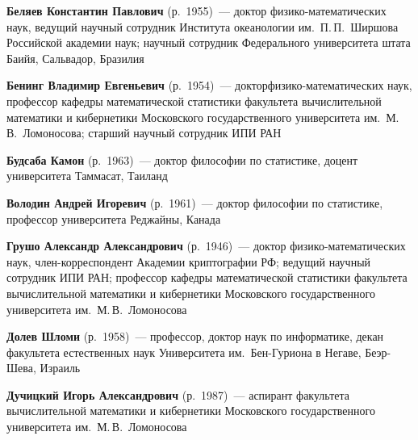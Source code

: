 \begin{multicols}{2}




\noindent
\textbf{Беляев Константин Павлович} (р.\ 1955)~--- доктор фи\-зи\-ко-ма\-те\-ма\-ти\-че\-ских 
наук, ведущий научный сотрудник Института океанологии им.\ П.\,П.~Ширшова 
Российской академии наук; научный сотрудник Федерального университета штата Баийя, 
Сальвадор, Бразилия

\vspace*{4pt}

\noindent
\textbf{Бенинг Владимир Евгеньевич} (р.\ 1954)~--- 
доктор\linebreak фи\-зи\-ко-ма\-те\-ма\-ти\-че\-ских наук, профессор кафедры 
математической статистики факультета вычислительной математики и 
кибернетики Московского государственного университета им.\ М.\,В.~Ломоносова; 
старший научный сотрудник ИПИ РАН

\vspace*{4pt}

\noindent
\textbf{Будсаба Камон} (р.\ 1963)~--- 
доктор философии по статистике, доцент университета Таммасат,
Таиланд

\vspace*{4pt}

\noindent
\textbf{Володин Андрей Игоревич} (р.\ 1961)~--- доктор философии  по статистике,
профессор университета Реджайны, Канада

\vspace*{4pt}

\noindent 
\textbf{Грушо Александр Александрович} (р.\ 1946)~---
доктор фи\-зи\-ко-ма\-те\-ма\-ти\-че\-ских наук,  член-корреспондент Академии криптографии
РФ; ведущий научный сотрудник ИПИ РАН; профессор кафедры математической статистики
факультета вычислительной математики и кибернетики 
Московского государственного университета им.\ М.\,В.~Ломоносова

\vspace*{4pt}

\noindent
\textbf{Долев Шломи} (р.\ 1958)~--- профессор, доктор наук по информатике, декан факультета
естественных наук Университета им.\ Бен-Гуриона в Негаве, Беэр-Шева, Израиль


\vspace*{4pt}


\noindent 
\textbf{Дучицкий Игорь Александрович} (р.\ 1987)~---
аспирант факультета
вычислительной математики и кибернетики 
Московского государственного университета им.\ М.\,В.~Ломоносова


\end{multicols}

